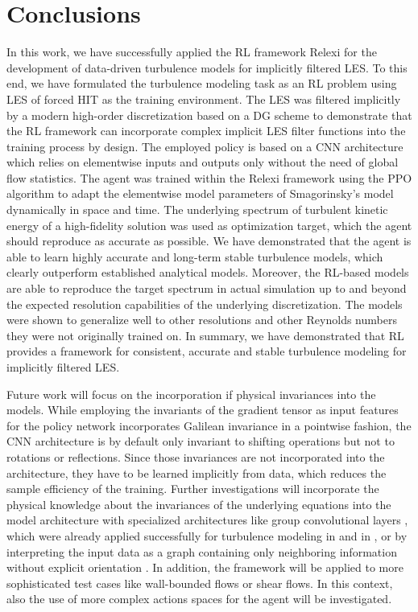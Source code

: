 \section{Conclusions}
\label{sec:conclusion}

In this work, we have successfully applied the RL framework Relexi \cite{kurz2022deep} for the development of data-driven turbulence models for implicitly filtered LES.
To this end, we have formulated the turbulence modeling task as an RL problem using LES of forced HIT as the training environment.
The LES was filtered implicitly by a modern high-order discretization based on a DG scheme to demonstrate that the RL framework can incorporate complex implicit LES filter functions into the training process by design.
The employed policy is based on a CNN architecture which relies on elementwise inputs and outputs only without the need of global flow statistics.
The agent was trained within the Relexi framework using the PPO algorithm to adapt the elementwise model parameters of Smagorinsky's model dynamically in space and time.
The underlying spectrum of turbulent kinetic energy of a high-fidelity solution was used as optimization target, which the agent should reproduce as accurate as possible.
We have demonstrated that the agent is able to learn highly accurate and long-term stable turbulence models, which clearly outperform established analytical models.
Moreover, the RL-based models are able to reproduce the target spectrum in actual simulation up to and beyond the expected resolution capabilities of the underlying discretization.
The models were shown to generalize well to other resolutions and other Reynolds numbers they were not originally trained on.
In summary, we have demonstrated that RL provides a framework for consistent, accurate and stable turbulence modeling for implicitly filtered LES.

Future work will focus on the incorporation if physical invariances into the models.
While employing the invariants of the gradient tensor as input features for the policy network incorporates Galilean invariance in a pointwise fashion, the CNN architecture is by default only invariant to shifting operations but not to rotations or reflections.
Since those invariances are not incorporated into the architecture, they have to be learned implicitly from data, which reduces the sample efficiency of the training.
Further investigations will incorporate the physical knowledge about the invariances of the underlying equations into the model architecture with specialized architectures like group convolutional layers \cite{cohen2016group}, which were already applied successfully for turbulence modeling in \cite{pawar2022frame} and in \cite{guan2023learning}, or by interpreting the input data as a graph containing only neighboring information without explicit orientation \cite{niepert2016learning,wu2020comprehensive}.
In addition, the framework will be applied to more sophisticated test cases like wall-bounded flows or shear flows.
In this context, also the use of more complex actions spaces for the agent will be investigated.

